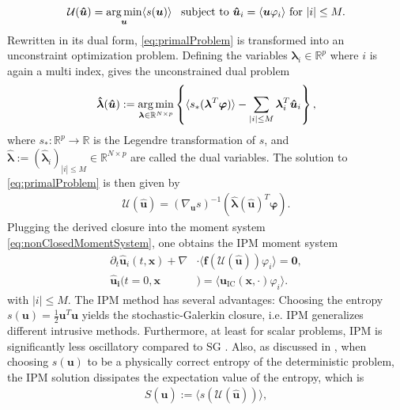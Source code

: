 \begin{align}\label{eq:primalProblem}
\mathcal{U}(\bm{\hat u}) = \operatorname*{arg\,min}_{\bm u} \langle s(\bm u) \rangle \enskip \text{ subject to } \bm{\hat u}_i = \langle \bm u \varphi_i \rangle \text{ for } |i| \leq M.
\end{align}
Rewritten in its dual form, \eqref{eq:primalProblem} is transformed into an unconstraint optimization problem. Defining the variables $\bm{\lambda}_i\in\mathbb{R}^p$ where $i$ is again a multi index, gives the unconstrained dual problem
\begin{align}\label{eq:dualProblem}
 \bm{\hat \lambda}(\bm{\hat u}) := \operatorname*{arg\,min}_{\bm{\lambda} \in \mathbb{R}^{N \times p}}
  \left\{\langle s_*(\bm{\lambda}^T \bm\varphi)\rangle - \sum_{|i|\leq M}\bm{\lambda}_i^T \bm{\hat u}_i\right\},
\end{align}
where $s_*:\mathbb{R}^p\to\mathbb{R}$ is the Legendre transformation of $s$, and $\bm{ \hat\lambda}:=(\bm{\hat{\lambda}}_i)_{|i|\leq M}\in \mathbb{R}^{N \times p}$ are called the dual variables. The solution to \eqref{eq:primalProblem} is then given by
\begin{align}\label{eq:ansatz}
 \mathcal{U}(\bm{\hat u}) = \left( \nabla_{\bm{u}} s \right)^{-1}(\bm{\hat{\lambda}}(\bm{\hat u})^T \bm{\varphi}).
\end{align}
Plugging the derived closure into the moment system \eqref{eq:nonClosedMomentSystem}, one obtains the IPM moment system
\begin{subequations}\label{eq:IPMmomentSystem}
\begin{align}
\partial_t \bm{\hat u}_i(t,\bm{x}) + \nabla&\cdot\langle\bm{f}(\mathcal{U}(\bm{\hat u})) \varphi_i\rangle = \bm{0}, \\
\bm{\hat u_i}(t=0,\bm{x}&) = \langle\bm{u}_{\text{IC}}(\bm{x},\cdot)\varphi_i\rangle.
\end{align}
\end{subequations}
with $|i|\leq M$. The IPM method has several advantages: Choosing the entropy $s(\bm{u}) = \frac{1}{2}\bm{u}^T\bm{u}$ yields the stochastic-Galerkin closure, i.e. IPM generalizes different intrusive methods. Furthermore, at least for scalar problems, IPM is significantly less oscillatory compared to SG \cite{kusch2017maximum}. Also, as discussed in \cite{poette2009uncertainty}, when choosing $s(\bm u)$ to be a physically correct entropy of the deterministic problem, the IPM solution dissipates the expectation value of the entropy, which is
\begin{align*}
S(\bm{\hat u}) := \langle s( \mathcal{U}(\bm{\hat u}))\rangle,
\end{align*}
